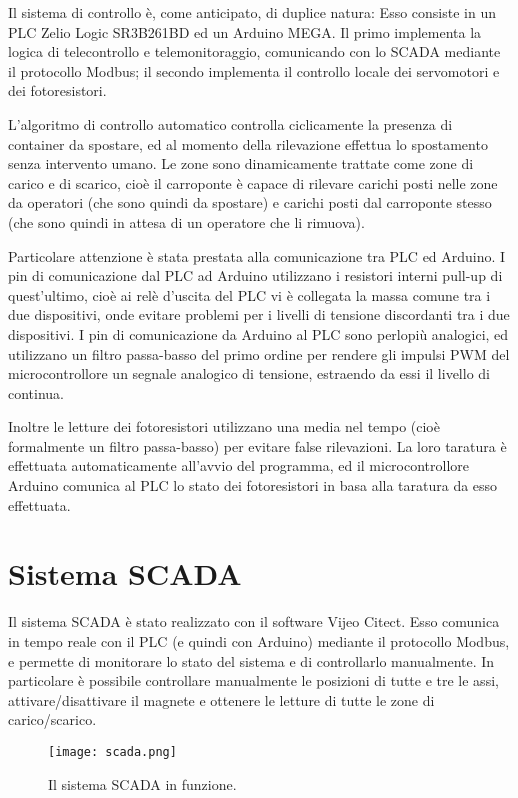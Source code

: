 Il sistema di controllo è, come anticipato, di duplice natura: Esso consiste in un PLC Zelio Logic
SR3B261BD ed un Arduino MEGA. Il primo implementa la logica di telecontrollo e
telemonitoraggio, comunicando con lo SCADA mediante il protocollo Modbus; il secondo implementa il
controllo locale dei servomotori e dei fotoresistori.

L'algoritmo di controllo automatico controlla ciclicamente la presenza di container da spostare, ed
al momento della rilevazione effettua lo spostamento senza intervento umano. Le zone sono
dinamicamente trattate come zone di carico e di scarico, cioè il carroponte è capace di rilevare
carichi posti nelle zone da operatori (che sono quindi da spostare) e carichi posti dal carroponte
stesso (che sono quindi in attesa di un operatore che li rimuova).

Particolare attenzione è stata prestata alla comunicazione tra PLC ed Arduino. I pin di
comunicazione dal PLC ad Arduino utilizzano i resistori interni pull-up di quest'ultimo, cioè ai
relè d'uscita del PLC vi è collegata la massa comune tra i due dispositivi, onde evitare problemi
per i livelli di tensione discordanti tra i due dispositivi. I pin di comunicazione da Arduino al
PLC sono perlopiù analogici, ed utilizzano un filtro passa-basso del primo ordine per rendere gli
impulsi PWM del microcontrollore un segnale analogico di tensione, estraendo da essi il livello di
continua.

Inoltre le letture dei fotoresistori utilizzano una media nel tempo (cioè formalmente un filtro
passa-basso) per evitare false rilevazioni. La loro taratura è effettuata automaticamente all'avvio
del programma, ed il microcontrollore Arduino comunica al PLC lo stato dei fotoresistori in basa
alla taratura da esso effettuata.

\section{Sistema SCADA}

Il sistema SCADA è stato realizzato con il software Vijeo Citect. Esso comunica in tempo reale con
il PLC (e quindi con Arduino) mediante il protocollo Modbus, e permette di monitorare lo stato del
sistema e di controllarlo manualmente. In particolare è possibile controllare manualmente le
posizioni di tutte e tre le assi, attivare/disattivare il magnete e ottenere le letture di tutte le
zone di carico/scarico.

\begin{figure}[htbp]\centering
    \caption{Il sistema SCADA in funzione.}
    \texttt{[image: scada.png]}
\end{figure}

